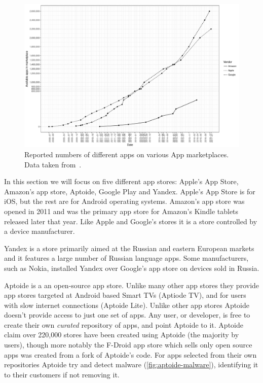 \documentclass[thesis.tex]{subfiles}
\begin{document}
\begin{figure}
  \includegraphics[width=\textwidth]{figures/app-store-apps.pdf}
  \caption[Reported numbers of different apps on various App marketplaces.]{%
    Reported numbers of different apps on various App marketplaces. Data taken from~\cite{statista_google_nodate,statista_apple_nodate,statista_amazon_nodate}.}
  \label{fig:app-store-apps}
\end{figure}

In this section we will focus on five different app stores: Apple's App Store,
Amazon's app store, Aptoide, Google Play and Yandex.  Apple's App Store is for iOS,
but the rest are for Android operating systems.  
Amazon's app store was opened in 2011 and was the primary app store for Amazon's
Kindle tablets released later that year.  Like Apple and Google's stores it is a
store controlled by a device manufacturer.

Yandex is a store primarily aimed at the Russian and eastern European markets
and it features a large number of Russian language apps. Some manufacturers,
such as Nokia, installed Yandex over Google's app store on devices sold in
Russia.

Aptoide is a an open-source app store.  Unlike many other app stores they
provide app stores targeted at Android based Smart TVs (Aptiode TV), and for
users with slow internet connections (Aptoide Lite).  Unlike other app stores
Aptoide doesn't provide access to just one set of apps.  Any user, or developer,
is free to create their own \emph{curated} repository of apps, and point Aptoide
to it.  Aptoide claim over 220,000 stores have been created using Aptoide (the
majority by users), though more notably the F-Droid app store which sells only
open source apps was created from a fork of Aptoide's code.
For apps selected from their own repositories Aptoide try and detect malware
(\autoref{fig:aptoide-malware}), identifying it to their customers if not
removing it.
\end{document}
